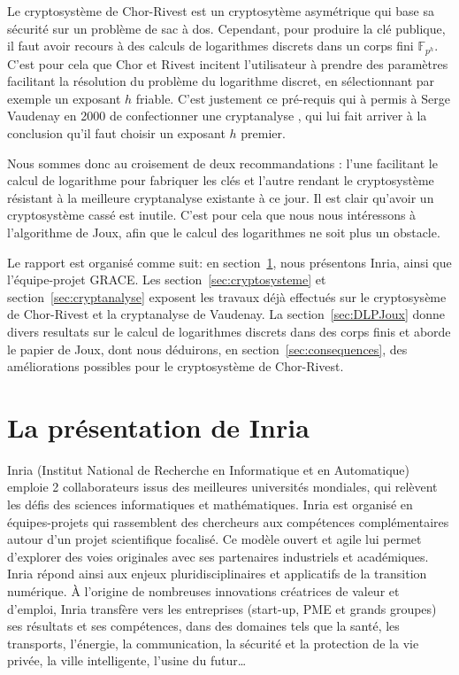 \documentclass[a4paper, titlepage, 11pt]{article}
\theoremstyle{definition}
\theoremstyle{remark}
\def\gf #1{\mathbb{F}_{#1}}
\begin{document}
Le cryptosystème de Chor-Rivest est un cryptosytème asymétrique qui base sa sécurité sur un problème de sac à dos. Cependant, pour produire la clé publique, il faut avoir recours à des calculs de logarithmes discrets dans un corps fini $\gf{p^h}$. C'est pour cela que Chor et Rivest incitent l'utilisateur à prendre des paramètres facilitant la résolution du problème du logarithme discret, en sélectionnant par exemple un exposant $h$ friable. C'est justement ce pré-requis qui à permis à Serge Vaudenay en 2000 de confectionner une cryptanalyse \cite{vaudenay2000}, qui lui fait arriver à la conclusion qu'il faut choisir un exposant $h$ premier.

Nous sommes donc au croisement de deux recommandations : l'une facilitant le calcul de logarithme pour fabriquer les clés et l'autre rendant le cryptosystème résistant à la meilleure cryptanalyse existante à ce jour. Il est clair qu'avoir un cryptosystème cassé est inutile. C'est pour cela que nous nous intéressons à l'algorithme de Joux, afin que le calcul des logarithmes ne soit plus un obstacle.

Le rapport est organisé comme suit: en section~\ref{sec:presInria}, nous présentons Inria, ainsi que l'équipe-projet GRACE. Les section~\ref{sec:cryptosysteme} et section~\ref{sec:cryptanalyse} exposent les travaux déjà effectués sur le cryptosysème de Chor-Rivest et la cryptanalyse de Vaudenay. La section~\ref{sec:DLPJoux} donne divers resultats sur le calcul de logarithmes discrets dans des corps finis et aborde le papier de Joux, dont nous déduirons, en section~\ref{sec:consequences}, des améliorations possibles pour le cryptosystème de Chor-Rivest.

\setcounter{tocdepth}{1}
\tableofcontents
\newpage

\section{La présentation de Inria}\label{sec:presInria}

Inria (Institut National de Recherche en Informatique et en Automatique) emploie 2 collaborateurs issus des meilleures universités mondiales, qui relèvent les défis des sciences informatiques et mathématiques. Inria est organisé en \og{}équipes-projets\fg{} qui rassemblent des chercheurs aux compétences complémentaires autour d’un projet scientifique focalisé. Ce modèle ouvert et agile lui permet d’explorer des voies originales avec ses partenaires industriels et académiques. Inria répond ainsi aux enjeux pluridisciplinaires et applicatifs de la transition numérique. À l'origine de nombreuses innovations créatrices de valeur et d'emploi, Inria transfère vers les entreprises (start-up, PME et grands groupes) ses résultats et ses compétences, dans des domaines tels que la santé, les transports, l'énergie, la communication, la sécurité et la protection de la vie privée, la ville intelligente, l’usine du futur\dots
\end{document}
